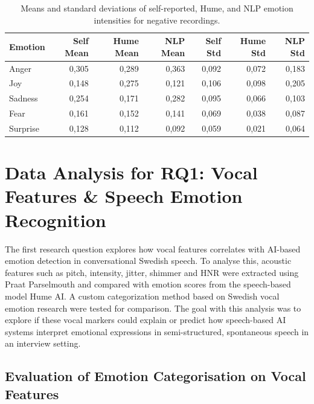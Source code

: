 \begin{table}[H]
    \centering
    \caption*{\textbf{Negative Recordings}}
    \begin{tabular}{lrrrrrr}
      \toprule
      \textbf{Emotion} & \textbf{Self Mean} & \textbf{Hume Mean} & \textbf{NLP Mean} & \textbf{Self Std} & \textbf{Hume Std} & \textbf{NLP Std} \\
      \midrule
      Anger    & 0,305 & 0,289 & 0,363 & 0,092 & 0,072 & 0,183 \\
      Joy      & 0,148 & 0,275 & 0,121 & 0,106 & 0,098 & 0,205 \\
      Sadness  & 0,254 & 0,171 & 0,282 & 0,095 & 0,066 & 0,103 \\
      Fear     & 0,161 & 0,152 & 0,141 & 0,069 & 0,038 & 0,087 \\
      Surprise & 0,128 & 0,112 & 0,092 & 0,059 & 0,021 & 0,064 \\
      \bottomrule
    \end{tabular}
    \caption{Means and standard deviations of self-reported, Hume, and NLP emotion intensities for negative recordings.}
    \label{tab:rq3_emotion-stats_neg}
  \end{table}




\section{Data Analysis for RQ1: Vocal Features \& Speech Emotion Recognition}
The first research question explores how vocal features correlates with AI-based emotion detection in conversational Swedish speech. 
To analyse this, acoustic features such as pitch, intensity, jitter, shimmer and HNR were extracted using Praat Parselmouth and compared with emotion 
scores from the speech-based model Hume AI. A custom categorization method based on Swedish vocal emotion research \autocite{Ekberg2023} were tested for comparison. 
The goal with this analysis was to explore if these vocal markers could explain or predict how speech-based AI systems interpret emotional expressions in 
semi-structured, spontaneous speech in an interview setting. 

\subsection{Evaluation of Emotion Categorisation on Vocal Features}
\label{rq1_pilot_tests}

